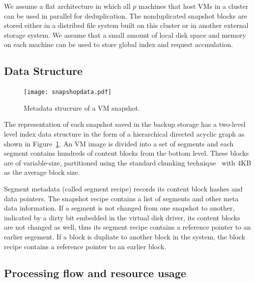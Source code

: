 We assume a flat architecture in which  all $p$ machines that host VMs in a cluster can 
be used in parallel for deduplication. 
The nonduplicated snapshot blocks are stored either in a distribed file system built on
this cluster  or in another  external storage system. 
We assume that  a small amount of local disk space and memory on each machine can be used 
to store global index and request accmulation.


\subsection{Data Structure}

\begin{figure}
\centering
\texttt{[image: snapshopdata.pdf]}
\caption{ Metadata strucrure of a VM snapshot.}
\label{fig:snapshot}
\end{figure}

The representation of each snapshot saved in the backup storage
has a two-level level index data structure in the form of a hierarchical
directed acyclic graph as shown in Figure~\ref{fig:snapshot}.
An VM image is divided into a set of segments and each  segment contains hundreds of content blocks from the bottom level.
These blocks are of variable-size, partitioned using
the standard chunking technique~\cite{similar94} with 4KB as the average block size. 

Segment metadata (called segment recipe) records its  content block hashes and data pointers. 
The snapshot recipe contains a list of segments and other meta data information.
If a segment is not changed from one snapshot to another, indicated by a dirty bit embedded in the virtual disk driver, 
its content blocks are not changed as well, thus its segment recipe contains a reference pointer to an earlier segement.
If a block is dupliate to another block in the system,  the block recipe contains a reference pointer to an earlier block.


\subsection{Processing flow and resource usage}

